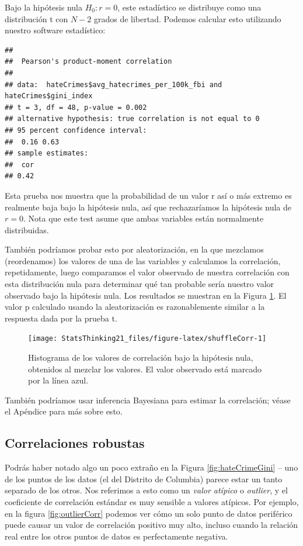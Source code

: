 \documentclass[
  12pt,
]{book}
\begin{document}
Bajo la hipótesis nula \(H_0:r=0\), este estadístico se distribuye como una distribución t con \(N - 2\) grados de libertad. Podemos calcular esto utilizando nuestro software estadístico:

\begin{verbatim}
## 
##  Pearson's product-moment correlation
## 
## data:  hateCrimes$avg_hatecrimes_per_100k_fbi and hateCrimes$gini_index
## t = 3, df = 48, p-value = 0.002
## alternative hypothesis: true correlation is not equal to 0
## 95 percent confidence interval:
##  0.16 0.63
## sample estimates:
##  cor 
## 0.42
\end{verbatim}

Esta prueba nos muestra que la probabilidad de un valor r así o más extremo es realmente baja bajo la hipótesis nula, así que rechazaríamos la hipótesis nula de \(r=0\). Nota que este test asume que ambas variables están normalmente distribuidas.

También podríamos probar esto por aleatorización, en la que mezclamos (reordenamos) los valores de una de las variables y calculamos la correlación, repetidamente, luego comparamos el valor observado de nuestra correlación con esta distribución nula para determinar qué tan probable sería nuestro valor observado bajo la hipótesis nula. Los resultados se muestran en la Figura \ref{fig:shuffleCorr}. El valor p calculado usando la aleatorización es razonablemente similar a la respuesta dada por la prueba t.

\begin{figure}
\texttt{[image: StatsThinking21\_files/figure-latex/shuffleCorr-1]} \caption{Histograma de los valores de correlación bajo la hipótesis nula, obtenidos al mezclar los valores. El valor observado está marcado por la línea azul.}\label{fig:shuffleCorr}
\end{figure}

También podríamos usar inferencia Bayesiana para estimar la correlación; véase el Apéndice para más sobre esto.

\hypertarget{robust-correlations}{%
\subsection{Correlaciones robustas}\label{robust-correlations}}

Podrás haber notado algo un poco extraño en la Figura \ref{fig:hateCrimeGini} -- uno de los puntos de los datos (el del Distrito de Columbia) parece estar un tanto separado de los otros. Nos referimos a esto como un \emph{valor atípico} o \emph{outlier}, y el coeficiente de correlación estándar es muy sensible a valores atípicos. Por ejemplo, en la figura \ref{fig:outlierCorr} podemos ver cómo un solo punto de datos periférico puede causar un valor de correlación positivo muy alto, incluso cuando la relación real entre los otros puntos de datos es perfectamente negativa.
\end{document}
